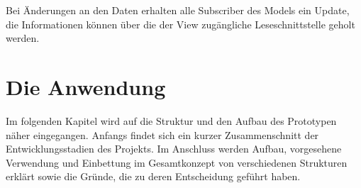 \documentclass[
							a4paper, 
							11pt, 
							openany, 
							liststotoc,
							parskip=half, 
   							headings=normal
						]{scrreprt}
\begin{document}
{Bei Änderungen an den Daten erhalten alle Subscriber des Models ein Update, die Informationen können über die der View zugängliche Leseschnittstelle geholt werden.

\clearpage




\chapter{Die Anwendung} \label{ch:anwendung}
Im folgenden Kapitel wird auf die Struktur und den Aufbau des Prototypen näher eingegangen.\newline
Anfangs findet sich ein kurzer Zusammenschnitt der Entwicklungsstadien des Projekts.\newline
Im Anschluss werden Aufbau, vorgesehene Verwendung und Einbettung im Gesamtkonzept von verschiedenen Strukturen erklärt sowie die Gründe, die zu deren Entscheidung geführt haben.

}
\end{document}
